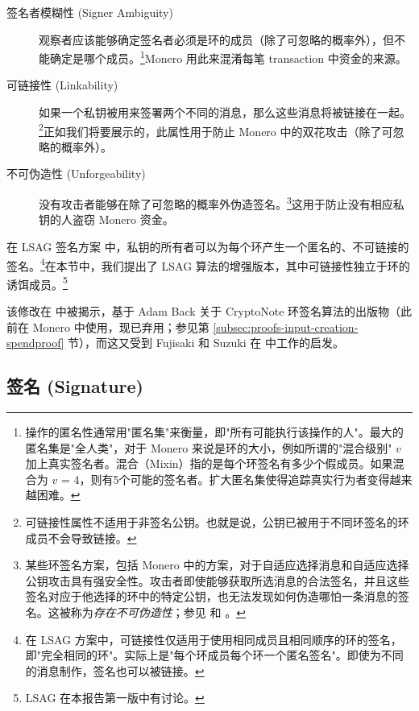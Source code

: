 \begin{description}
	\item[签名者模糊性 (Signer Ambiguity)]
	观察者应该能够确定签名者必须是环的成员（除了可忽略的概率外），但不能确定是哪个成员。\footnote{\label{anonymity_note}操作的匿名性通常用"匿名集"来衡量，即"所有可能执行该操作的人"。最大的匿名集是"全人类"，对于 Monero 来说是环的大小，例如所谓的"混合级别" $v$ 加上真实签名者。混合（Mixin）指的是每个环签名有多少个假成员。如果混合为 $v$ = 4，则有5个可能的签名者。扩大匿名集使得追踪真实行为者变得越来越困难。}Monero 用此来混淆每笔 transaction 中资金的来源。

	\item[可链接性 (Linkability)]
	如果一个私钥被用来签署两个不同的消息，那么这些消息将被链接在一起。\footnote{\label{linkability_note}可链接性属性不适用于非签名公钥。也就是说，公钥已被用于不同环签名的环成员不会导致链接。}正如我们将要展示的，此属性用于防止 Monero 中的双花攻击（除了可忽略的概率外）。

	\item[不可伪造性 (Unforgeability)]
    没有攻击者能够在除了可忽略的概率外伪造签名。\footnote{\label{unforgeability_note}某些环签名方案，包括 Monero 中的方案，对于自适应选择消息和自适应选择公钥攻击具有强安全性。攻击者即使能够获取所选消息的合法签名，并且这些签名对应于他选择的环中的特定公钥，也无法发现如何伪造哪怕一条消息的签名。这被称为{\em 存在不可伪造性}；参见 \cite{MRL-0005-ringct} 和 \cite{Liu2004}。}这用于防止没有相应私钥的人盗窃 Monero 资金。
\end{description}

在 LSAG 签名方案 \cite{Liu2004} 中，私钥的所有者可以为每个环产生一个匿名的、不可链接的签名。\footnote{\label{lsag_linkability_note}在 LSAG 方案中，可链接性仅适用于使用相同成员且相同顺序的环的签名，即"完全相同的环"。实际上是"每个环成员每个环一个匿名签名"。即使为不同的消息制作，签名也可以被链接。}在本节中，我们提出了 LSAG 算法的增强版本，其中可链接性独立于环的诱饵成员。\footnote{LSAG 在本报告第一版中有讨论。\cite{ztm-1}}

该修改在 \cite{MRL-0005-ringct} 中被揭示，基于 Adam Back \cite{AdamBack-ring-efficiency} 关于 CryptoNote \cite{cryptoNoteWhitePaper} 环签名算法的出版物（此前在 Monero 中使用，现已弃用；参见第 \ref{subsec:proofs-input-creation-spendproof} 节），而这又受到 Fujisaki 和 Suzuki 在 \cite{Fujisaki2007} 中工作的启发。


\subsection*{签名 (Signature)}

